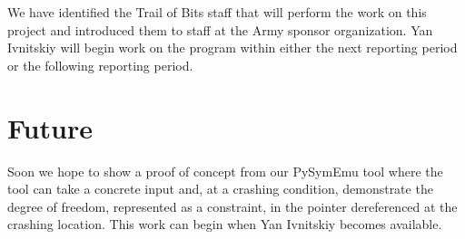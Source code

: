\documentclass{article}
\begin{document}
We have identified the Trail of Bits staff that will perform the work on 
this project and introduced them to staff at the Army sponsor organization. 
Yan Ivnitskiy will begin work on the program within either the 
next reporting period or the following reporting period. 

\section{Future}

Soon we hope to show a proof of concept from our PySymEmu tool where the 
tool can take a concrete input and, at a crashing condition, demonstrate the
degree of freedom, represented as a constraint, in the pointer dereferenced 
at the crashing location. This work can begin when Yan Ivnitskiy becomes
available. 



\end{document}
